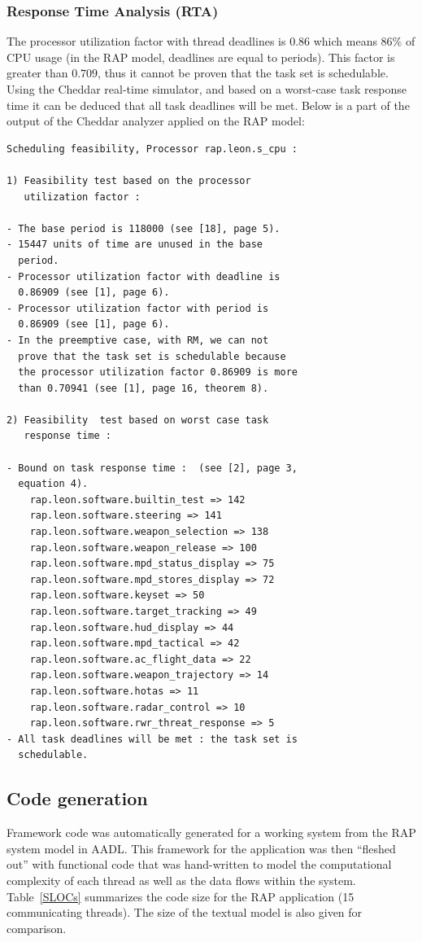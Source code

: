 \subsubsection{Response Time Analysis (RTA)}
The processor utilization factor with thread deadlines is $0.86$ which
means $86\%$ of CPU usage (in the RAP model, deadlines are equal to
periods). This factor is greater than $0.709$, thus it cannot be
proven that the task set is schedulable. Using the Cheddar real-time
simulator, and based on a worst-case task response time it can be
deduced that all task deadlines will be met. Below is a part of the
output of the Cheddar analyzer applied on the RAP model: {\small
\begin{verbatim}
Scheduling feasibility, Processor rap.leon.s_cpu :

1) Feasibility test based on the processor 
   utilization factor :

- The base period is 118000 (see [18], page 5).
- 15447 units of time are unused in the base 
  period.
- Processor utilization factor with deadline is 
  0.86909 (see [1], page 6).
- Processor utilization factor with period is 
  0.86909 (see [1], page 6).
- In the preemptive case, with RM, we can not 
  prove that the task set is schedulable because 
  the processor utilization factor 0.86909 is more 
  than 0.70941 (see [1], page 16, theorem 8).

2) Feasibility  test based on worst case task 
   response time :

- Bound on task response time :  (see [2], page 3, 
  equation 4).
    rap.leon.software.builtin_test => 142
    rap.leon.software.steering => 141
    rap.leon.software.weapon_selection => 138
    rap.leon.software.weapon_release => 100
    rap.leon.software.mpd_status_display => 75
    rap.leon.software.mpd_stores_display => 72
    rap.leon.software.keyset => 50
    rap.leon.software.target_tracking => 49
    rap.leon.software.hud_display => 44
    rap.leon.software.mpd_tactical => 42
    rap.leon.software.ac_flight_data => 22
    rap.leon.software.weapon_trajectory => 14
    rap.leon.software.hotas => 11
    rap.leon.software.radar_control => 10
    rap.leon.software.rwr_threat_response => 5
- All task deadlines will be met : the task set is 
  schedulable.
\end{verbatim}
}
\subsection{Code generation}
Framework code was automatically generated for a working system from
the RAP system model in AADL. This framework for the application was
then ``fleshed out'' with functional code that was hand-written to
model the computational complexity of each thread as well as the data
flows within the system. Table~\ref{SLOCs} summarizes the code size
for the RAP application (15 communicating threads). The size of the
\aadl textual model is also given for comparison.

